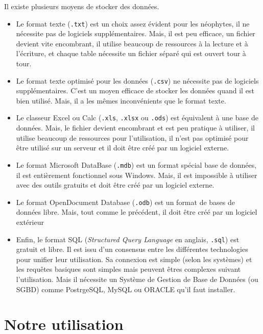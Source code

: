Il existe plusieurs moyens de stocker des données.
\begin{itemize}
	\item Le format texte (\verb-.txt-) est un choix assez évident pour les néophytes, il ne nécessite pas de logiciels supplémentaires. Mais, il est peu efficace, un fichier devient vite encombrant, il utilise beaucoup de ressources à la lecture et à l'écriture, et chaque table nécessite un fichier séparé qui est ouvert tour à tour.
	
	\item Le format texte optimisé pour les données (\verb-.csv-) ne nécessite pas de logiciels supplémentaires. C'est un moyen efficace de stocker les données quand il est bien utilisé. Mais, il a les mêmes inconvénients que le format texte.
	
	\item Le classeur Excel ou Calc (\verb-.xls-, \verb-.xlsx- ou \verb-.ods-) est équivalent à une base de données. Mais, le fichier devient encombrant et est peu pratique à utiliser, il utilise beaucoup de ressources pour l'utilisation, il n'est pas optimisé pour être utilisé sur un serveur et il doit être créé par un logiciel externe.
	
	\item Le format Microsoft DataBase (\verb-.mdb-) est un format spécial base de données, il est entièrement fonctionnel sous Windows. Mais, il est impossible à utiliser avec des outils gratuits et doit être créé par un logiciel externe.
	
	\item Le format OpenDocument Database (\verb-.odb-) est un format de bases de données libre. Mais, tout comme le précédent, il doit être créé par un logiciel extérieur
	
	\item Enfin, le format SQL (\emph{Structured Query Language} en anglais, \verb-.sql-) est gratuit et libre. Il est issu d'un consensus entre les différentes technologies pour unifier leur utilisation. Sa connexion est simple (selon les systèmes) et les requêtes basiques sont simples mais peuvent êtres complexes suivant l'utilisation. Mais il nécessite un Système de Gestion de Base de Données (ou SGBD) comme PostrgeSQL, MySQL ou ORACLE qu'il faut installer.
\end{itemize}

\section{Notre utilisation}


